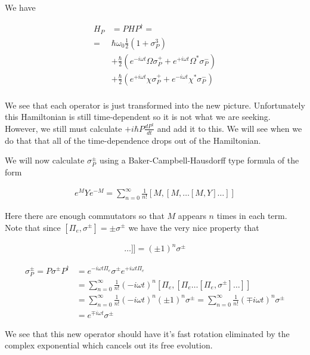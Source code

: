 \documentclass[12pt]{article}
\newcommand{\ddt}[1]{\frac{d #1}{dt}}
\begin{document}
We have

\begin{align}
H_P &= PHP^{\dag} =\\
= &\hbar \omega_0 \frac{1}{2}\left(1+\sigma^3_P\right)\\
&+ \frac{\hbar}{2}\left(e^{-i\omega t}\Omega\sigma^+_P +  e^{+i\omega t}\Omega^* \sigma^-_P \right)\\
&+ \frac{\hbar}{2}\left( e^{+i\omega t}\chi\sigma^+_P + e^{-i\omega t}\chi^* \sigma^-_P \right)\\
\end{align}

We see that each operator is just transformed into the new picture. Unfortunately this Hamiltonian is still time-dependent so it is not what we are seeking. However, we still must calculate $+i\hbar P \ddt{P^\dag}$ and add it to this. We will see when we do that that all of the time-dependence drops out of the Hamiltonian.

We will now calculate $\sigma^{\pm}_P$ using a Baker-Campbell-Hausdorff type formula of the form

\begin{align}
e^{M}Ye^{-M} = \sum_{n=0}^{\infty} \frac{1}{n!}[M,[M,\ldots[M,Y]\ldots]]
\end{align}

Here there are enough commutators so that $M$ appears $n$ times in each term.
Note that since $[\Pi_e,\sigma^{\pm}] = \pm \sigma^{\pm}$ we have the very nice property that

\begin{align}
[\Pi_e,[\Pi_e,\ldots[\Pi_e,\sigma^{\pm}]\ldots]] = (\pm 1)^n \sigma^{\pm}
\end{align}

\begin{align}
\sigma^{\pm}_P = P\sigma^{\pm}P^{\dag} &= e^{-i\omega t \Pi_e} \sigma^{\pm} e^{+i\omega t \Pi_e}\\
&= \sum_{n=0}^{\infty} \frac{1}{n!} (-i\omega t)^n [\Pi_e,[\Pi_e\ldots[\Pi_e,\sigma^{\pm}]\ldots]]\\
&= \sum_{n=0}^{\infty} \frac{1}{n!} (-i\omega t)^n (\pm 1)^n \sigma^{\pm} = \sum_{n=0}^{\infty} \frac{1}{n!} (\mp i\omega t)^n \sigma^{\pm}\\
&= e^{\mp i \omega t}\sigma^{\pm}
\end{align}

We see that this new operator should have it's fast rotation eliminated by the complex exponential which cancels out its free evolution.
\end{document}
